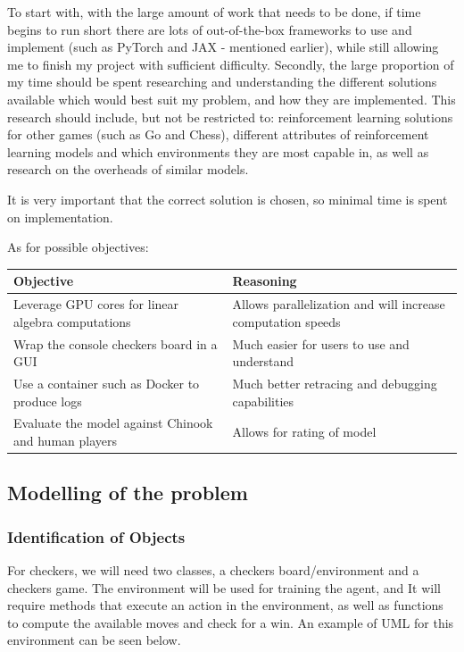 \documentclass{article}
\makeatletter
\newcommand\subsubsubsection{\@startsection{paragraph}{4}{\z@}{-2.5ex\@plus -1ex \@minus -.25ex}{1.25ex \@plus .25ex}{\normalfont\normalsize\bfseries}}
\makeatother
\begin{document}
    To start with, with the large amount of work that needs to be done, if time begins to run short there are lots of out-of-the-box frameworks
    to use and implement (such as PyTorch and JAX - mentioned earlier), while still allowing me to finish my project with sufficient difficulty.
    Secondly, the large proportion of my time should be spent researching and understanding the different solutions available which would best
    suit my problem, and how they are implemented. This research should include, but not be restricted to: reinforcement learning solutions for
    other games (such as Go and Chess), different attributes of reinforcement learning models and which environments they are most capable in, as well
    as research on the overheads of similar models.

    It is very important that the correct solution is chosen, so minimal time is spent on implementation.

    As for possible objectives:
    \begin{center}
        \begin{tabular}{|m{15em}|m{15em}|}
            \hline 
            Objective & Reasoning \\
            \hline
            Leverage GPU cores for linear algebra computations & Allows parallelization and will increase computation speeds  \\      
            \hline
            Wrap the console checkers board in a GUI & Much easier for users to use and understand \\
            \hline
            Use a container such as Docker to produce logs & Much better retracing and debugging capabilities \\
            \hline
            Evaluate the model against Chinook and human players & Allows for rating of model \\
            \hline
        \end{tabular}
    \end{center}

    \subsection{Modelling of the problem}

    \subsubsection{Identification of Objects}

    \subsubsubsection{Checkers}
    For checkers, we will need two classes, a checkers board/environment and a checkers game. The environment will be used for training the agent, and It will require methods that
    execute an action in the environment, as well as functions to compute the available moves and check for a win. An example of UML for this environment can be seen below. 
\end{document}
